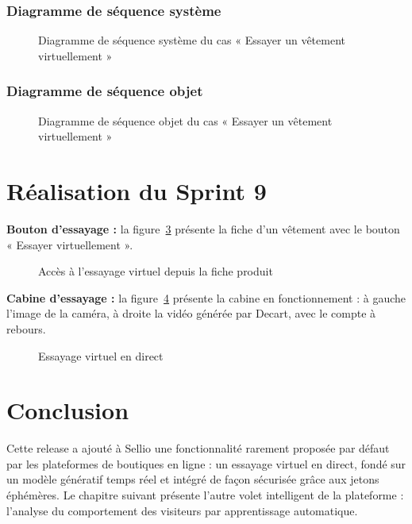 \subsubsection{Diagramme de séquence système}
\begin{figure}[H]
    \centering
    \caption{Diagramme de séquence système du cas « Essayer un vêtement virtuellement »}
    \label{fig:dss-tryon}
\end{figure}

\subsubsection{Diagramme de séquence objet}
\begin{figure}[H]
    \centering
    \caption{Diagramme de séquence objet du cas « Essayer un vêtement virtuellement »}
    \label{fig:dso-tryon}
\end{figure}

\section{Réalisation du Sprint 9}
\textbf{Bouton d'essayage :} la figure~\ref{fig:ui-tryon-btn} présente la fiche d'un vêtement avec le bouton « Essayer virtuellement ».
\begin{figure}[H]
    \centering
    \caption{Accès à l'essayage virtuel depuis la fiche produit}
    \label{fig:ui-tryon-btn}
\end{figure}

\textbf{Cabine d'essayage :} la figure~\ref{fig:ui-tryon} présente la cabine en fonctionnement : à gauche l'image de la caméra, à droite la vidéo générée par Decart, avec le compte à rebours.
\begin{figure}[H]
    \centering
    \caption{Essayage virtuel en direct}
    \label{fig:ui-tryon}
\end{figure}

\section*{Conclusion}
Cette release a ajouté à Sellio une fonctionnalité rarement proposée par défaut par les plateformes de boutiques en ligne : un essayage virtuel en direct, fondé sur un modèle génératif temps réel et intégré de façon sécurisée grâce aux jetons éphémères. Le chapitre suivant présente l'autre volet intelligent de la plateforme : l'analyse du comportement des visiteurs par apprentissage automatique.
